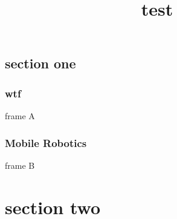 \documentclass{beamer}
\title{test}
\begin{document}
\begin{frame}
	\maketitle
\end{frame}


\begin{frame}
	\tableofcontents
\end{frame}


\begin{frame}
	\section{section one}
	\frametitle{wtf}
	frame A
\end{frame}

\begin{frame}
	\frametitle{Mobile Robotics}
	frame B
\end{frame}

\section{section two}
%	
%	
%	
\end{document}
